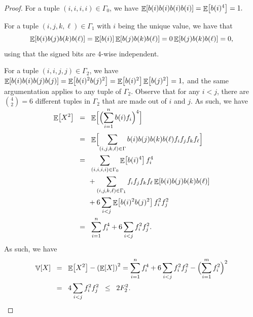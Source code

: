 \begin{proof}
    For a tuple $(i,i,i,i) \in \Gamma_0$, we have
    \begin{math}
        \Ex{b(i) b(i) b(i) b(i)}%
        =%
        \Ex{b(i)^4}%
        =%
        1.
    \end{math}

    \smallskip

    For a tuple $(i,j,k,\ell) \in \Gamma_1$ with $i$ being the unique
    value, we have that
    \begin{equation*}
        \Ex{b(i) b(j) b(k) b(\ell)}
        =%
        \Ex{b(i)} \Ex{ b(j) b(k) b(\ell)}
        =%
        0 \Ex{ b(j) b(k) b(\ell)}
        =%
        0,
    \end{equation*}
    using that the signed bits are $4$-wise independent.

    For a tuple $(i,i,j,j) \in \Gamma_2$, we have
    \begin{math}
        \Ex{b(i) b(i) b(j) b(j)}%
        =%
        \Ex{b(i)^2 b(j)^2}%
        =%
        \Ex{b(i)^2} \Ex{ b(j)^2} =%
        1,
    \end{math}
    and the same argumentation applies to any tuple of $\Gamma_2$.
    Observe that for any $i <j$, there are $\binom{4}{2} = 6$
    different tuples in $\Gamma_2$ that are made out of $i$ and $j$.
    As such, we have
    \begin{align*}
      \Ex{X^2}
      &\EQ%
        \Ex{\smash{ \Bigl(  \sum_{i=1}^n b(i) \frq_i \Bigr)^4}
        \Bigr.}%
     \\[0.3cm]&
     \EQ%
        \Ex{\Bigr. \smash{  \sum_{(i,j,k,\ell) \in \Gamma} b(i)b(j)
        b(k) b(\ell)
        \frq_i\frq_j \frq_k \frq_\ell} %
        }
      \\[0.3cm]
      &%
        \EQ%
        \sum_{(i,i,i,i) \in \Gamma_0} \Ex{b(i)^4} \frq_i^4
        \\&
        \qquad+ \sum_{(i,j,k,\ell) \in \Gamma_1} \frq_i\frq_j \frq_k
        \frq_\ell \Ex{b(i) b(j) b(k) b(\ell)}
        \\&
        \qquad+ 6 \sum_{i < j }  \Ex{b(i)^2 b(j)^2} \frq_i^2 \frq_j^2
      \\%
      &%
        \EQ%
        \sum_{i=1}^n  \frq_i^4
        + 6 \sum_{i < j }  \frq_i^2 \frq_j^2.
    \end{align*}
    As such, we have
    \begin{align*}
        \Var{X}%
        &\EQ%
        \Ex{X^2} - \pth{\Ex{X}}^2%
        = %
        \sum_{i=1}^n  \frq_i^4
        + 6 \sum_{i < j }  \frq_i^2 \frq_j^2
        - \Bigl( \sum_{i=1}^m  \frq_i^2 \Bigr)^2
        \\&
        \EQ%
        4 \sum_{i < j }  \frq_i^2 \frq_j^2 %
        \LEQ%
        2 \Frq_2^2.
    \end{align*}
\end{proof}

